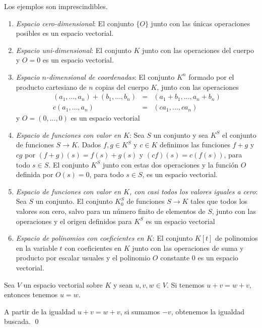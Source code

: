 \begin{ejem}\label{ejem0}
Los ejemplos son imprescindibles.
\begin{enumerate}
\item \emph{Espacio cero-dimensional}: El conjunto $\{O\}$ junto con las \'unicas operaciones posibles es un espacio vectorial.
\item \emph{Espacio uni-dimensional}: El conjunto $K$ junto con las operaciones del cuerpo y $O=0$ es un espacio vectorial.
\item \emph{Espacio $n$-dimensional de coordenadas}: El conjunto $K^n$ formado por el producto cartesiano de $n$ copias del cuerpo $K$, junto con las operaciones
\begin{eqnarray*}
(a_1,\ldots,a_n)+(b_1,\ldots,b_n) & = & (a_1+b_1,\ldots,a_n+b_n)\\
c(a_1,\ldots,a_n) & = & (ca_1,\ldots,ca_n)
\end{eqnarray*}
y $O=(0,\ldots,0)$ es un espacio vectorial
\item \emph{Espacio de funciones con valor en $K$}: Sea $S$ un conjunto y sea $K^S$ el conjunto de funciones $S\rightarrow K$. Dados $f,g\in K^S$ y $c\in K$ definimos las funciones $f+g$ y $cg$ por
$(f+g)(s) = f(s)+g(s)$ y $(cf)(s) = c(f(s))$, para todo $s\in S$. El conjunto $K^S$ junto con estas dos operaciones y la funci\'on $O$ definida por $O(s)=0$, para todo $s\in S$, es un espacio vectorial.
\item \emph{Espacio de funciones con valor en $K$, con casi todos los valores iguales a cero}: Sea $S$ un conjunto. El conjunto $K^S_0$ de funciones $S\rightarrow K$ tales que todos los valores son cero, salvo para un n\'umero finito de elementos de $S$, junto con las operaciones y el origen definidos para $K^S$ es un espacio vectorial
\item \emph{Espacio de polinomios con coeficientes en $K$}: El conjunto $K[t]$ de polinomios en la variable $t$ con coeficientes en $K$ junto con las operaciones de suma y producto por escalar usuales y el polinomio $O$ constante $0$ es un espacio vectorial.
\end{enumerate} 
\end{ejem}

\begin{prop}
Sea $V$ un espacio vectorial sobre $K$ y sean $u,v,w\in V$. Si tenemos $u+v=w+v$, entonces tenemos $u=w$.
\end{prop}

\dem A partir de la igualdad $u+v=w+v$, si sumamos $-v$, obtenemos la igualdad buscada. \qed

